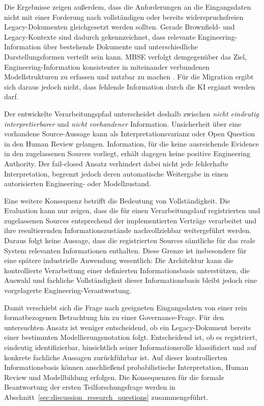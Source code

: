 Die Ergebnisse zeigen außerdem, dass die Anforderungen an die Eingangsdaten
nicht mit einer Forderung nach vollständigen oder bereits widerspruchsfreien
Legacy-Dokumenten gleichgesetzt werden sollten. Gerade Brownfield- und
Legacy-Kontexte sind dadurch gekennzeichnet, dass relevante
Engineering-Information über bestehende Dokumente und unterschiedliche
Darstellungsformen verteilt sein kann. MBSE verfolgt demgegenüber das Ziel,
Engineering-Information konsistenter in miteinander verbundenen
Modellstrukturen zu erfassen und nutzbar zu machen \cite{Hendriks2022}.
Für die Migration ergibt sich daraus jedoch nicht, dass fehlende Information
durch die KI ergänzt werden darf.

Der entwickelte Verarbeitungspfad unterscheidet deshalb zwischen
\emph{nicht eindeutig interpretierbarer} und \emph{nicht vorhandener}
Information. Unsicherheit über eine vorhandene Source-Aussage kann als
Interpretationsvarianz oder Open Question in den Human Review gelangen.
Information, für die keine ausreichende Evidence in den zugelassenen Sources
vorliegt, erhält dagegen keine positive Engineering Authority. Der
fail-closed Ansatz verhindert dabei nicht jede fehlerhafte Interpretation,
begrenzt jedoch deren automatische Weitergabe in einen autorisierten
Engineering- oder Modellzustand.

Eine weitere Konsequenz betrifft die Bedeutung von Vollständigkeit.
Die Evaluation kann nur zeigen, dass die für einen Verarbeitungslauf
registrierten und zugelassenen Sources entsprechend der implementierten
Verträge verarbeitet und ihre resultierenden Informationszustände
nachvollziehbar weitergeführt werden. Daraus folgt keine Aussage, dass die
registrierten Sources sämtliche für das reale System relevanten Informationen
enthalten. Diese Grenze ist insbesondere für eine spätere industrielle
Anwendung wesentlich: Die Architektur kann die kontrollierte Verarbeitung
einer definierten Informationsbasis unterstützen, die Auswahl und fachliche
Vollständigkeit dieser Informationsbasis bleibt jedoch eine vorgelagerte
Engineering-Verantwortung.

Damit verschiebt sich die Frage nach geeigneten Eingangsdaten von einer rein
formatbezogenen Betrachtung hin zu einer Governance-Frage. Für den
untersuchten Ansatz ist weniger entscheidend, ob ein Legacy-Dokument bereits
einer bestimmten Modellierungsnotation folgt. Entscheidend ist, ob es
registriert, eindeutig identifizierbar, hinsichtlich seiner Informationsrolle
klassifiziert und auf konkrete fachliche Aussagen zurückführbar ist. Auf
dieser kontrollierten Informationsbasis können anschließend probabilistische
Interpretation, Human Review und Modellbildung erfolgen. Die Konsequenzen für
die formale Beantwortung der ersten Teilforschungsfrage werden in
Abschnitt~\ref{sec:discussion_research_questions} zusammengeführt.

